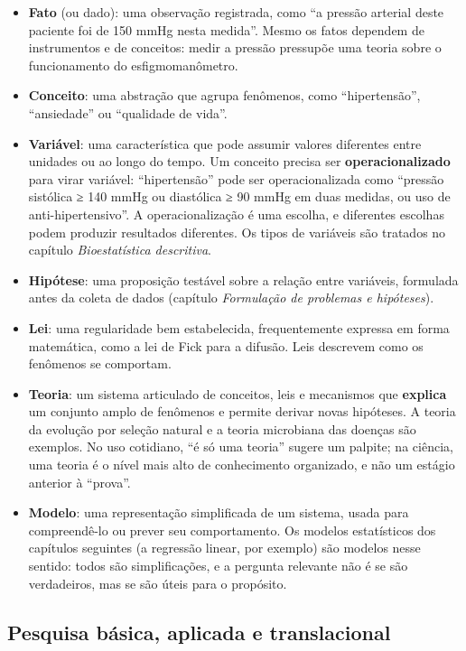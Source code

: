 \documentclass[
]{book}
\providecommand{\tightlist}{%
  \setlength{\itemsep}{0pt}\setlength{\parskip}{0pt}}
\begin{document}
\begin{itemize}
\tightlist
\item
  \textbf{Fato} (ou dado): uma observação registrada, como ``a pressão arterial deste paciente foi de 150 mmHg nesta medida''. Mesmo os fatos dependem de instrumentos e de conceitos: medir a pressão pressupõe uma teoria sobre o funcionamento do esfigmomanômetro.
\item
  \textbf{Conceito}: uma abstração que agrupa fenômenos, como ``hipertensão'', ``ansiedade'' ou ``qualidade de vida''.
\item
  \textbf{Variável}: uma característica que pode assumir valores diferentes entre unidades ou ao longo do tempo. Um conceito precisa ser \textbf{operacionalizado} para virar variável: ``hipertensão'' pode ser operacionalizada como ``pressão sistólica ≥ 140 mmHg ou diastólica ≥ 90 mmHg em duas medidas, ou uso de anti-hipertensivo''. A operacionalização é uma escolha, e diferentes escolhas podem produzir resultados diferentes. Os tipos de variáveis são tratados no capítulo \emph{Bioestatística descritiva}.
\item
  \textbf{Hipótese}: uma proposição testável sobre a relação entre variáveis, formulada antes da coleta de dados (capítulo \emph{Formulação de problemas e hipóteses}).
\item
  \textbf{Lei}: uma regularidade bem estabelecida, frequentemente expressa em forma matemática, como a lei de Fick para a difusão. Leis descrevem como os fenômenos se comportam.
\item
  \textbf{Teoria}: um sistema articulado de conceitos, leis e mecanismos que \textbf{explica} um conjunto amplo de fenômenos e permite derivar novas hipóteses. A teoria da evolução por seleção natural e a teoria microbiana das doenças são exemplos. No uso cotidiano, ``é só uma teoria'' sugere um palpite; na ciência, uma teoria é o nível mais alto de conhecimento organizado, e não um estágio anterior à ``prova''.
\item
  \textbf{Modelo}: uma representação simplificada de um sistema, usada para compreendê-lo ou prever seu comportamento. Os modelos estatísticos dos capítulos seguintes (a regressão linear, por exemplo) são modelos nesse sentido: todos são simplificações, e a pergunta relevante não é se são verdadeiros, mas se são úteis para o propósito.
\end{itemize}

\subsection{Pesquisa básica, aplicada e translacional}\label{pesquisa-buxe1sica-aplicada-e-translacional}
\end{document}
